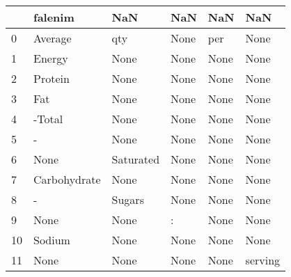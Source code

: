\begin{tabular}{llllll}
\toprule
{} &       falenim &        NaN &   NaN &   NaN &      NaN \\
\midrule
0  &       Average &        qty &  None &   per &     None \\
1  &        Energy &       None &  None &  None &     None \\
2  &       Protein &       None &  None &  None &     None \\
3  &           Fat &       None &  None &  None &     None \\
4  &        -Total &       None &  None &  None &     None \\
5  &             - &       None &  None &  None &     None \\
6  &          None &  Saturated &  None &  None &     None \\
7  &  Carbohydrate &       None &  None &  None &     None \\
8  &             - &     Sugars &  None &  None &     None \\
9  &          None &       None &     : &  None &     None \\
10 &        Sodium &       None &  None &  None &     None \\
11 &          None &       None &  None &  None &  serving \\
\bottomrule
\end{tabular}
